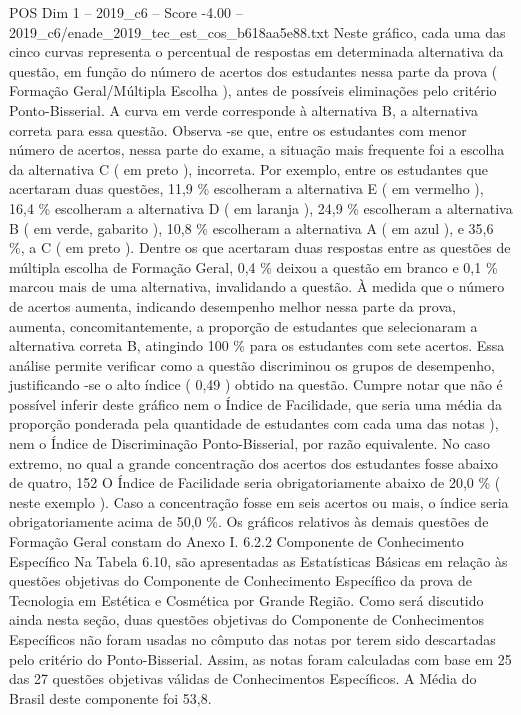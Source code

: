 \begin{textsample}{POS Dim 1 – 2019\_c6 – Score -4.00 – 2019\_c6/enade\_2019\_tec\_est\_cos\_b618aa5e88.txt}
Neste gráfico, cada uma das cinco curvas representa o percentual de respostas em determinada alternativa da questão, em função do número de acertos dos estudantes nessa parte da prova ( Formação Geral/Múltipla Escolha ), antes de possíveis eliminações pelo critério Ponto-Bisserial.
A curva em verde corresponde à alternativa B, a alternativa correta para essa questão.
Observa -se que, entre os estudantes com menor número de acertos, nessa parte do exame, a situação mais frequente foi a escolha da alternativa C ( em preto ), incorreta.
Por exemplo, entre os estudantes que acertaram duas questões, 11,9 \% escolheram a alternativa E ( em vermelho ), 16,4 \% escolheram a alternativa D ( em laranja ), 24,9 \% escolheram a alternativa B ( em verde, gabarito ), 10,8 \% escolheram a alternativa A ( em azul ), e 35,6 \%, a C ( em preto ).
Dentre os que acertaram duas respostas entre as questões de múltipla escolha de Formação Geral, 0,4 \% deixou a questão em branco e 0,1 \% marcou mais de uma alternativa, invalidando a questão.
À medida que o número de acertos aumenta, indicando desempenho melhor nessa parte da prova, aumenta, concomitantemente, a proporção de estudantes que selecionaram a alternativa correta B, atingindo 100 \% para os estudantes com sete acertos.
Essa análise permite verificar como a questão discriminou os grupos de desempenho, justificando -se o alto índice ( 0,49 ) obtido na questão.
Cumpre notar que não é possível inferir deste gráfico nem o Índice de Facilidade, que seria uma média da proporção ponderada pela quantidade de estudantes com cada uma das notas ), nem o Índice de Discriminação Ponto-Bisserial, por razão equivalente.
No caso extremo, no qual a grande concentração dos acertos dos estudantes fosse abaixo de quatro, 152 O Índice de Facilidade seria obrigatoriamente abaixo de 20,0 \% ( neste exemplo ).
Caso a concentração fosse em seis acertos ou mais, o índice seria obrigatoriamente acima de 50,0 \%.
Os gráficos relativos às demais questões de Formação Geral constam do Anexo I. 6.2.2 Componente de Conhecimento Específico Na Tabela 6.10, são apresentadas as Estatísticas Básicas em relação às questões objetivas do Componente de Conhecimento Específico da prova de Tecnologia em Estética e Cosmética por Grande Região.
Como será discutido ainda nesta seção, duas questões objetivas do Componente de Conhecimentos Específicos não foram usadas no cômputo das notas por terem sido descartadas pelo critério do Ponto-Bisserial.
Assim, as notas foram calculadas com base em 25 das 27 questões objetivas válidas de Conhecimentos Específicos.
A Média do Brasil deste componente foi 53,8.

\end{textsample}
